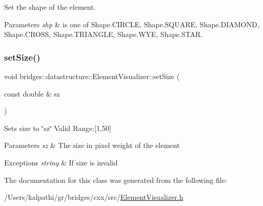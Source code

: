 Set the shape of the element. 


\begin{DoxyParams}{Parameters}
{\em shp} & is one of Shape.\+C\+I\+R\+C\+LE, Shape.\+S\+Q\+U\+A\+RE, Shape.\+D\+I\+A\+M\+O\+ND, Shape.\+C\+R\+O\+SS, Shape.\+T\+R\+I\+A\+N\+G\+LE, Shape.\+W\+YE, Shape.\+S\+T\+AR. \\
\hline
\end{DoxyParams}
\mbox{\label{classbridges_1_1datastructure_1_1_element_visualizer_a021333b1c20dd55627ac80ae3a2138e6}} 
\subsubsection{\texorpdfstring{setSize()}{setSize()}}
{\footnotesize\ttfamily void bridges\+::datastructure\+::\+Element\+Visualizer\+::set\+Size (\begin{DoxyParamCaption}\item[{const double \&}]{sz }\end{DoxyParamCaption})\hspace{0.3cm}{\ttfamily [inline]}}

Sets size to \char`\"{}sz\char`\"{} Valid Range\+:\mbox{[}1,50\mbox{]}


\begin{DoxyParams}{Parameters}
{\em sz} & The size in pixel weight of the element \\
\hline
\end{DoxyParams}

\begin{DoxyExceptions}{Exceptions}
{\em string} & If size is invalid \\
\hline
\end{DoxyExceptions}


The documentation for this class was generated from the following file\+:\begin{DoxyCompactItemize}
\item 
/\+Users/kalpathi/gr/bridges/cxx/src/\mbox{\hyperlink{_element_visualizer_8h}{Element\+Visualizer.\+h}}\end{DoxyCompactItemize}
